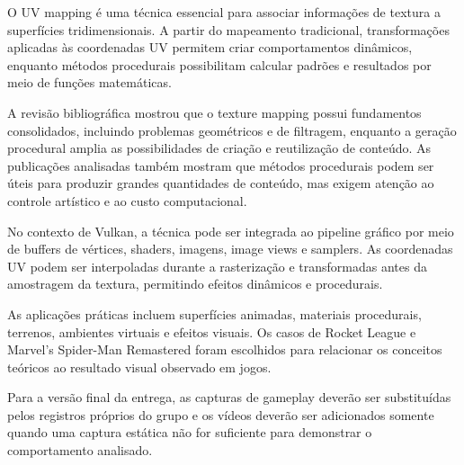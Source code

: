 
O UV mapping é uma técnica essencial para associar informações de textura a superfícies tridimensionais. A partir do mapeamento tradicional, transformações aplicadas às coordenadas UV permitem criar comportamentos dinâmicos, enquanto métodos procedurais possibilitam calcular padrões e resultados por meio de funções matemáticas.

A revisão bibliográfica mostrou que o texture mapping possui fundamentos consolidados, incluindo problemas geométricos e de filtragem, enquanto a geração procedural amplia as possibilidades de criação e reutilização de conteúdo. As publicações analisadas também mostram que métodos procedurais podem ser úteis para produzir grandes quantidades de conteúdo, mas exigem atenção ao controle artístico e ao custo computacional.

No contexto de Vulkan, a técnica pode ser integrada ao pipeline gráfico por meio de buffers de vértices, shaders, imagens, image views e samplers. As coordenadas UV podem ser interpoladas durante a rasterização e transformadas antes da amostragem da textura, permitindo efeitos dinâmicos e procedurais.

As aplicações práticas incluem superfícies animadas, materiais procedurais, terrenos, ambientes virtuais e efeitos visuais. Os casos de Rocket League e Marvel's Spider-Man Remastered foram escolhidos para relacionar os conceitos teóricos ao resultado visual observado em jogos.

Para a versão final da entrega, as capturas de gameplay deverão ser substituídas pelos registros próprios do grupo e os vídeos deverão ser adicionados somente quando uma captura estática não for suficiente para demonstrar o comportamento analisado.

